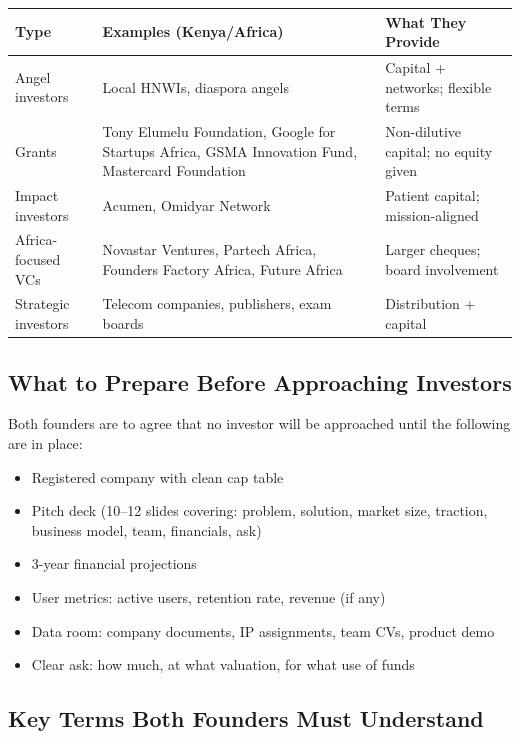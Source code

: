 \documentclass[12pt,a4paper]{article}
\newcommand{\cb}{$\square$\;}                   %
\begin{document}
\begin{tabularx}{\linewidth}{L{3.5cm} L{5cm} X}
  \toprule
  \textbf{Type} & \textbf{Examples (Kenya/Africa)} & \textbf{What They Provide} \\
  \midrule
  Angel investors      & Local HNWIs, diaspora angels    & Capital + networks; flexible terms \\[0.3em]
  Grants               & Tony Elumelu Foundation, Google for Startups Africa, GSMA Innovation Fund, Mastercard Foundation & Non-dilutive capital; no equity given \\[0.3em]
  Impact investors     & Acumen, Omidyar Network         & Patient capital; mission-aligned \\[0.3em]
  Africa-focused VCs   & Novastar Ventures, Partech Africa, Founders Factory Africa, Future Africa & Larger cheques; board involvement \\[0.3em]
  Strategic investors  & Telecom companies, publishers, exam boards & Distribution + capital \\
  \bottomrule
\end{tabularx}

\subsection{What to Prepare Before Approaching Investors}

Both founders are to agree that no investor will be approached until the following are in place:

\begin{itemize}[label=\cb]
  \item Registered company with clean cap table
  \item Pitch deck (10--12 slides covering: problem, solution, market size, traction, business model, team, financials, ask)
  \item 3-year financial projections
  \item User metrics: active users, retention rate, revenue (if any)
  \item Data room: company documents, IP assignments, team CVs, product demo
  \item Clear ask: how much, at what valuation, for what use of funds
\end{itemize}

\subsection{Key Terms Both Founders Must Understand}
\end{document}
